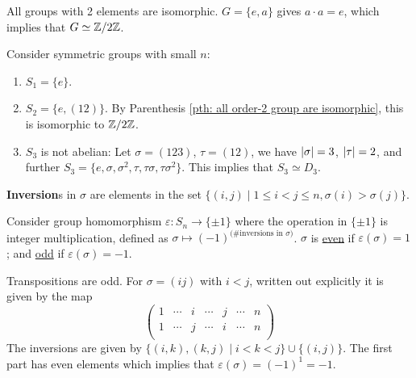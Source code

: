 \documentclass{article}
\begin{document}
\begin{parenthesis} \label{pth: all order-2 group are isomorphic}
    All groups with 2 elements are isomorphic. $G = \{e, a\}$ gives $a \cdot a = e$, which implies that $G \simeq \mathbb{Z}/2\mathbb{Z}$.
\end{parenthesis}

\begin{example}
    Consider symmetric groups with small $n$: 
    \begin{enumerate}
        \item $S_1 = \{e\}$. 
        \item $S_2 = \{e, (1 2)\}$. By Parenthesis \ref{pth: all order-2 group are isomorphic}, this is isomorphic to $\mathbb{Z}/2\mathbb{Z}$.
        \item $S_3$ is not abelian: Let $\sigma = (1 2 3)$, $\tau = (1 2)$, we have $\left|\sigma\right| = 3$, $\left|\tau\right| = 2$, and further $S_3 = \{e, \sigma, \sigma^2, \tau, \tau\sigma, \tau\sigma^2\}$. This implies that $S_3 \simeq D_3$.
    \end{enumerate}
\end{example}

\begin{definition}[Inversion]
    \textbf{Inversion}s in $\sigma$ are elements in the set $\{ (i, j) \mid 1 \leq i < j \leq n , \sigma(i) > \sigma(j)\}$.
\end{definition}

\begin{definition}[Signature]
    Consider group homomorphism $\varepsilon: S_n \to \{ \pm 1 \}$ where the operation in $\{ \pm 1 \}$ is integer multiplication, defined as $\sigma \mapsto (-1)^{\text{(\# inversions in $\sigma$)}}$. $\sigma$ is \underline{even} if $\varepsilon(\sigma) = 1$; and \underline{odd} if $\varepsilon(\sigma) = -1$. 
\end{definition}

\begin{example}
    Transpositions are odd. For $\sigma = (i j)$ with $i < j$, written out explicitly it is given by the map
    \[
        \begin{pmatrix}
            1 & \cdots & i & \cdots & j & \cdots & n \\
            1 & \cdots & j & \cdots & i & \cdots & n \\
        \end{pmatrix}
    \]
    The inversions are given by $\{ (i, k), (k, j) \mid i < k < j \} \cup \{ (i, j) \}$. The first part has even elements which implies that $\varepsilon(\sigma) = (-1)^1 = -1$. 
\end{example}
\end{document}
